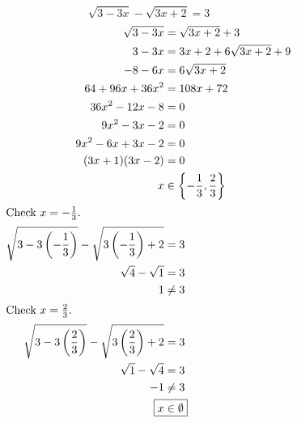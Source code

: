 	\subsection{}
		\[\sqrt{3 - 3x} - \sqrt{3x + 2} = 3\]
		\begin{align*}
			\sqrt{3 - 3x} &= \sqrt{3x + 2} + 3 \\
			3 - 3x &= 3x + 2 + 6\sqrt{3x + 2} + 9 \\
			-8 - 6x &= 6\sqrt{3x + 2} \\
			64 + 96x + 36x^2 &= 108x + 72 \\
			36x^2 - 12x - 8 &= 0 \\
			9x^2 - 3x - 2 &= 0 \\
			9x^2 - 6x + 3x - 2 &= 0 \\
			(3x + 1)(3x - 2) &= 0 \\
			x &\in \left\{-\frac{1}{3}, \frac{2}{3}\right\} \\
			\intertext{Check $x = -\frac{1}{3}$.}
			\sqrt{3 - 3\left(-\frac{1}{3}\right)} - \sqrt{3\left(-\frac{1}{3}\right) + 2} &= 3 \\
			\sqrt{4} - \sqrt{1} &= 3 \\
			1 &\neq 3 \\
			\intertext{Check $x = \frac{2}{3}$.}
			\sqrt{3 - 3\left(\frac{2}{3}\right)} - \sqrt{3\left(\frac{2}{3}\right) + 2} &= 3 \\
			\sqrt{1} - \sqrt{4} &= 3 \\
			-1 &\neq 3 \\
			\Aboxed{x &\in \emptyset}
		\end{align*}
		\pagebreak{}

